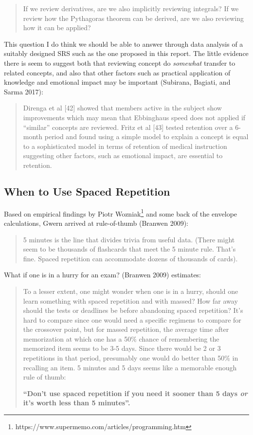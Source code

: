 \begin{quote}
If we review derivatives, are we also implicitly reviewing integrals? If
we review how the Pythagoras theorem can be derived, are we also
reviewing how it can be applied?
\end{quote}

This question I do think we should be able to answer through data
analysis of a suitably designed SRS such as the one proposed in this
report. The little evidence there is seem to suggest both that reviewing
concept do \emph{somewhat} transfer to related concepts, and also that
other factors such as practical application of knowledge and emotional
impact may be important (Subirana, Bagiati, and Sarma 2017):

\begin{quote}
Direnga et al {[}42{]} showed that members active in the subject show
improvements which may mean that Ebbinghaus speed does not applied if
``similar'' concepts are reviewed. Fritz et al {[}43{]} tested retention
over a 6-month period and found using a simple model to explain a
concept is equal to a sophisticated model in terms of retention of
medical instruction suggesting other factors, such as emotional impact,
are essential to retention.
\end{quote}

\subsection{When to Use Spaced
Repetition}\label{when-to-use-spaced-repetition}

Based on empirical findings by Piotr Wozniak\footnote{https://www.supermemo.com/articles/programming.htm}
and some back of the envelope calculations, Gwern arrived at
rule-of-thumb (Branwen 2009):

\begin{quote}
5 minutes is the line that divides trivia from useful data. (There might
seem to be thousands of flashcards that meet the 5 minute rule. That's
fine. Spaced repetition can accommodate dozens of thousands of cards).
\end{quote}

What if one is in a hurry for an exam? (Branwen 2009) estimates:

\begin{quote}
To a lesser extent, one might wonder when one is in a hurry, should one
learn something with spaced repetition and with massed? How far away
should the tests or deadlines be before abandoning spaced repetition?
It's hard to compare since one would need a specific regimens to compare
for the crossover point, but for massed repetition, the average time
after memorization at which one has a 50\% chance of remembering the
memorized item seems to be 3-5 days. Since there would be 2 or 3
repetitions in that period, presumably one would do better than 50\% in
recalling an item. 5 minutes and 5 days seems like a memorable enough
rule of thumb:

\textbf{``Don't use spaced repetition if you need it sooner than 5 days
\emph{or} it's worth less than 5 minutes''.}
\end{quote}

